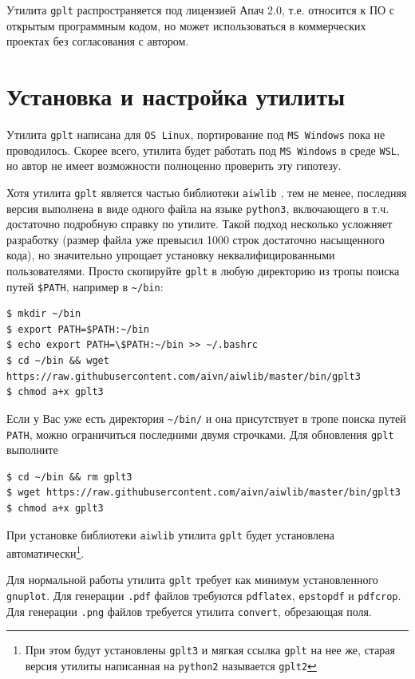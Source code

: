 \documentclass[12pt]{article}
\def\gplt{{\tt gplt}}
\def\gnuplot{{\tt gnuplot}}
\def\python{{\tt python3}}
\def\png{{\tt .png}}
\def\pdf{{\tt .pdf}}
\begin{document}
Утилита \gplt{} распространяется под лицензией Апач 2.0, т.е. относится к ПО с открытым программным кодом, но может использоваться в коммерческих проектах
без согласования с автором.

\section{Установка  и настройка утилиты}
\begin{figure}
  \vphantom{.}
  \vspace{-3cm}

\end{figure}
Утилита \gplt{} написана для \verb'OS Linux', портирование под \verb'MS Windows' пока не проводилось. Скорее всего, утилита будет работать
под \verb'MS Windows' в среде \verb'WSL', но автор не имеет возможности полноценно проверить эту гипотезу.

Хотя утилита \gplt{} является частью библиотеки \verb'aiwlib' \cite{aiwlib:SR:PP2018,aiwlib:SV2018,aiwlib:git},
тем не менее, последняя версия выполнена в виде одного файла на языке \python, включающего в т.ч. достаточно подробную справку по утилите.
Такой подход несколько усложняет разработку (размер файла уже превысил 1000 строк достаточно насыщенного кода), но значительно упрощает установку
неквалифицированными пользователями. Просто скопируйте \gplt{} в любую директорию из тропы поиска путей \verb'$PATH', например в \verb'~/bin':
\begin{verbatim}
$ mkdir ~/bin
$ export PATH=$PATH:~/bin
$ echo export PATH=\$PATH:~/bin >> ~/.bashrc
$ cd ~/bin && wget https://raw.githubusercontent.com/aivn/aiwlib/master/bin/gplt3 
$ chmod a+x gplt3
\end{verbatim}
Если у Вас уже есть директория \verb'~/bin/' и она присутствует в тропе поиска путей \verb'PATH', можно ограничиться последними двумя строчками.
Для обновления \gplt{} выполните
\begin{verbatim}
$ cd ~/bin && rm gplt3
$ wget https://raw.githubusercontent.com/aivn/aiwlib/master/bin/gplt3 
$ chmod a+x gplt3
\end{verbatim}

При установке библиотеки \verb'aiwlib' утилита \gplt{} будет установлена автоматически\footnote{При этом будут установлены {\tt gplt3} и мягкая ссылка {\tt gplt} на нее же, старая версия утилиты написанная на {\tt python2} называется {\tt gplt2}}.

Для нормальной работы утилита \gplt{} требует как минимум установленного \gnuplot. Для генерации \pdf{} файлов требуются \verb'pdflatex', \verb'epstopdf'
и \verb'pdfcrop'. Для генерации \png{} файлов требуется утилита \verb'convert', обрезающая поля.
\end{document}

